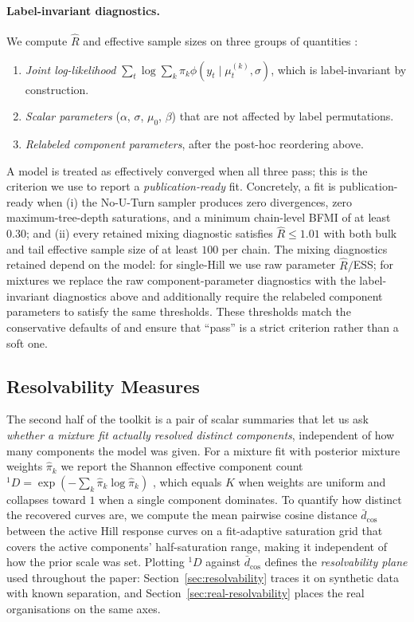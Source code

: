 \documentclass[11pt]{article}
\begin{document}
\paragraph{Label-invariant diagnostics.} We compute $\widehat{R}$ and effective sample sizes on three groups of quantities \citep{vehtari2021rhat}:
\begin{enumerate}
    \item \emph{Joint log-likelihood} $\sum_t \log \sum_k \pi_k \phi(y_t \mid \mu_t^{(k)}, \sigma)$, which is label-invariant by construction.
    \item \emph{Scalar parameters} ($\alpha$, $\sigma$, $\mu_0$, $\beta$) that are not affected by label permutations.
    \item \emph{Relabeled component parameters}, after the post-hoc reordering above.
\end{enumerate}
A model is treated as effectively converged when all three pass; this is the criterion we use to report a \emph{publication-ready} fit. Concretely, a fit is publication-ready when (i) the No-U-Turn sampler produces zero divergences, zero maximum-tree-depth saturations, and a minimum chain-level BFMI of at least $0.30$; and (ii) every retained mixing diagnostic satisfies $\widehat{R} \le 1.01$ with both bulk and tail effective sample size of at least $100$ per chain. The mixing diagnostics retained depend on the model: for single-Hill we use raw parameter $\widehat{R}/$ESS; for mixtures we replace the raw component-parameter diagnostics with the label-invariant diagnostics above and additionally require the relabeled component parameters to satisfy the same thresholds. These thresholds match the conservative defaults of \citet{vehtari2021rhat} and ensure that ``pass'' is a strict criterion rather than a soft one.

\subsection{Resolvability Measures}
\label{sec:resolvability-measures}

The second half of the toolkit is a pair of scalar summaries that let us ask \emph{whether a mixture fit actually resolved distinct components}, independent of how many components the model was given. For a mixture fit with posterior mixture weights $\hat\pi_k$ we report the Shannon effective component count $^1\!D = \exp(-\sum_k \hat\pi_k \log \hat\pi_k)$ \citep{hill1973diversity}, which equals $K$ when weights are uniform and collapses toward $1$ when a single component dominates. To quantify how distinct the recovered curves are, we compute the mean pairwise cosine distance $\bar{d}_{\cos}$ between the active Hill response curves on a fit-adaptive saturation grid that covers the active components' half-saturation range, making it independent of how the prior scale was set. Plotting $^1\!D$ against $\bar{d}_{\cos}$ defines the \emph{resolvability plane} used throughout the paper: Section~\ref{sec:resolvability} traces it on synthetic data with known separation, and Section~\ref{sec:real-resolvability} places the real organisations on the same axes.
\end{document}
